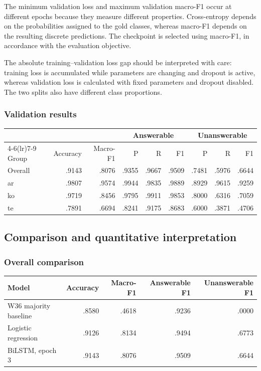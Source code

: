 \documentclass[11pt,a4paper]{article}
\begin{document}
The minimum validation loss and maximum validation macro-F1 occur at
different epochs because they measure different properties.
Cross-entropy depends on the probabilities assigned to the gold
classes, whereas macro-F1 depends on the resulting discrete predictions.
The checkpoint is selected using macro-F1, in accordance with the
evaluation objective.

The absolute training--validation loss gap should be interpreted with
care: training loss is accumulated while parameters are changing and
dropout is active, whereas validation loss is calculated with fixed
parameters and dropout disabled. The two splits also have different
class proportions.

\subsubsection{Validation results}

\begin{center}
\small
\begin{tabular}{lrrrrrrrr}
\toprule
& & & \multicolumn{3}{c}{Answerable}
      & \multicolumn{3}{c}{Unanswerable} \\
\cmidrule(lr){4-6}\cmidrule(lr){7-9}
Group & Accuracy & Macro-F1 & P & R & F1 & P & R & F1 \\
\midrule
Overall & .9143 & .8076 & .9355 & .9667 & .9509
        & .7481 & .5976 & .6644 \\
ar      & .9807 & .9574 & .9944 & .9835 & .9889
        & .8929 & .9615 & .9259 \\
ko      & .9719 & .8456 & .9795 & .9911 & .9853
        & .8000 & .6316 & .7059 \\
te      & .7891 & .6694 & .8241 & .9175 & .8683
        & .6000 & .3871 & .4706 \\
\bottomrule
\end{tabular}
\end{center}


\subsection{Comparison and quantitative interpretation}

\subsubsection{Overall comparison}

\begin{center}
\small
\begin{tabular}{lrrrr}
\toprule
Model & Accuracy & Macro-F1 & Answerable F1 & Unanswerable F1 \\
\midrule
W36 majority baseline & .8580 & .4618 & .9236 & .0000 \\
Logistic regression   & .9126 & .8134 & .9494 & .6773 \\
BiLSTM, epoch 3        & .9143 & .8076 & .9509 & .6644 \\
\bottomrule
\end{tabular}
\end{center}
\end{document}
